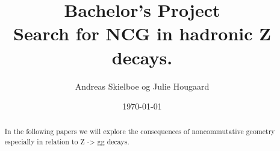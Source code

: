 \documentclass[11pt,a4paper,titlepage]{article}
\numberwithin{equation}{section}
\begin{document}
\title{Bachelor's Project\\Search for NCG in hadronic Z decays.}
\author{Andreas Skielboe og Julie Hougaard}
\date{\today}
\maketitle
{}

\begin{abstract}
In the following papers we will explore the consequences of noncommutative geometry especially in relation to Z -> gg decays.
\end{abstract}

\clearpage
\tableofcontents
\clearpage





\clearpage





\clearpage


\clearpage


\clearpage


\clearpage



\end{document}
